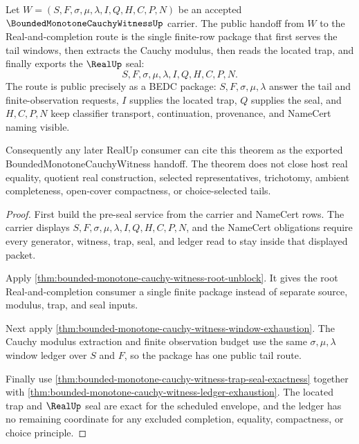 \begin{theorem}
\label{thm:bounded-monotone-cauchy-witness-seal-handoff}
Let $W=(S,F,\sigma,\mu,\lambda,I,Q,H,C,P,N)$ be an accepted $\BoundedMonotoneCauchyWitnessUp$ carrier. The public handoff from $W$ to the Real-and-completion route is the single finite-row package that first serves the tail windows, then extracts the Cauchy modulus, then reads the located trap, and finally exports the $\RealUp$ seal:
$$
S,F,\sigma,\mu,\lambda,I,Q,H,C,P,N.
$$
The route is public precisely as a BEDC package: $S,F,\sigma,\mu,\lambda$ answer the tail and finite-observation requests, $I$ supplies the located trap, $Q$ supplies the seal, and $H,C,P,N$ keep classifier transport, continuation, provenance, and NameCert naming visible.

Consequently any later RealUp consumer can cite this theorem as the exported BoundedMonotoneCauchyWitness handoff. The theorem does not close host real equality, quotient real construction, selected representatives, trichotomy, ambient completeness, open-cover compactness, or choice-selected tails.
\end{theorem}
\begin{proof}
First build the pre-seal service from the carrier and NameCert rows. The carrier displays $S,F,\sigma,\mu,\lambda,I,Q,H,C,P,N$, and the NameCert obligations require every generator, witness, trap, seal, and ledger read to stay inside that displayed packet.

Apply \autoref{thm:bounded-monotone-cauchy-witness-root-unblock}. It gives the root Real-and-completion consumer a single finite package instead of separate source, modulus, trap, and seal inputs.

Next apply \autoref{thm:bounded-monotone-cauchy-witness-window-exhaustion}. The Cauchy modulus extraction and finite observation budget use the same $\sigma,\mu,\lambda$ window ledger over $S$ and $F$, so the package has one public tail route.

Finally use \autoref{thm:bounded-monotone-cauchy-witness-trap-seal-exactness} together with \autoref{thm:bounded-monotone-cauchy-witness-ledger-exhaustion}. The located trap and $\RealUp$ seal are exact for the scheduled envelope, and the ledger has no remaining coordinate for any excluded completion, equality, compactness, or choice principle.
\end{proof}

